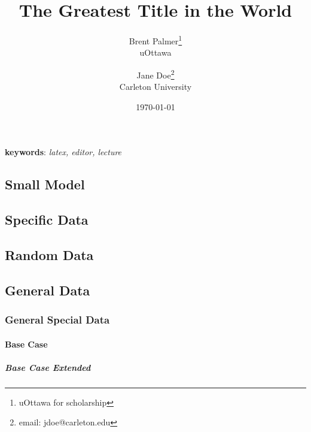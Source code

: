 \documentclass[12pt]{article}
\title{The Greatest Title in the World}
\author{Brent Palmer\thanks{uOttawa for scholarship}\\uOttawa \and Jane Doe\thanks{email: jdoe@carleton.edu}\\Carleton University}
\date{\today}
\begin{document}
\maketitle

\begin{abstract}
	\lipsum[7]
\end{abstract}

\textbf{keywords}: \emph{latex, editor, lecture}

\clearpage





\subsection{Small Model}

\lipsum[12]

\subsection{Specific Data}

\lipsum[5]

\subsection{Random Data}

\lipsum[7]

\subsection{General Data}

\lipsum[6]

\subsubsection{General Special Data}

\lipsum[8]

\paragraph{Base Case}

\lipsum[9]

\subparagraph{Base Case Extended}

\lipsum[10]

\clearpage

\end{document}
